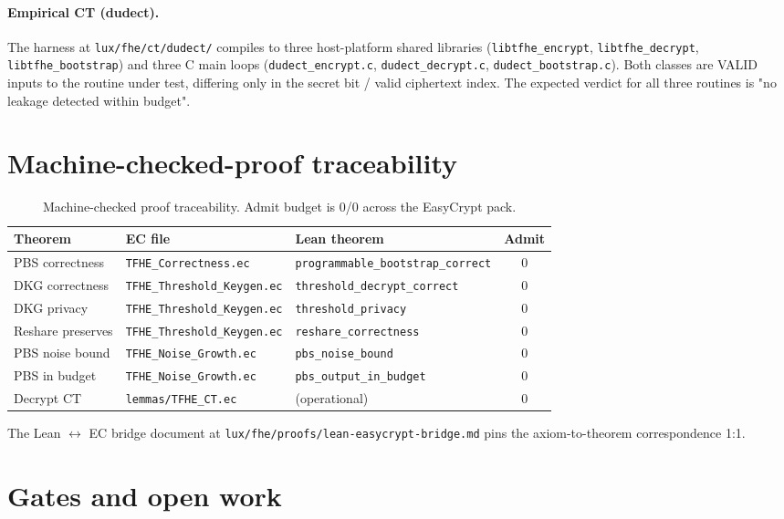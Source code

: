\documentclass[11pt,a4paper]{article}
\begin{document}
\paragraph{Empirical CT (dudect).} The harness at
\texttt{lux/fhe/ct/dudect/} compiles to three host-platform shared
libraries (\texttt{libtfhe\_encrypt}, \texttt{libtfhe\_decrypt},
\texttt{libtfhe\_bootstrap}) and three C main loops
(\texttt{dudect\_encrypt.c}, \texttt{dudect\_decrypt.c},
\texttt{dudect\_bootstrap.c}). Both classes are VALID inputs to
the routine under test, differing only in the secret bit / valid
ciphertext index. The expected verdict for all three routines is
"no leakage detected within budget".

\section{Machine-checked-proof traceability}
\label{sec:traceability}

\begin{table}[h]
\centering
\small
\begin{tabular}{lllc}
\toprule
Theorem & EC file & Lean theorem & Admit\\
\midrule
PBS correctness & \texttt{TFHE\_Correctness.ec} & \texttt{programmable\_bootstrap\_correct} & 0\\
DKG correctness & \texttt{TFHE\_Threshold\_Keygen.ec} & \texttt{threshold\_decrypt\_correct} & 0\\
DKG privacy & \texttt{TFHE\_Threshold\_Keygen.ec} & \texttt{threshold\_privacy} & 0\\
Reshare preserves & \texttt{TFHE\_Threshold\_Keygen.ec} & \texttt{reshare\_correctness} & 0\\
PBS noise bound & \texttt{TFHE\_Noise\_Growth.ec} & \texttt{pbs\_noise\_bound} & 0\\
PBS in budget & \texttt{TFHE\_Noise\_Growth.ec} & \texttt{pbs\_output\_in\_budget} & 0\\
Decrypt CT & \texttt{lemmas/TFHE\_CT.ec} & (operational) & 0\\
\bottomrule
\end{tabular}
\caption{Machine-checked proof traceability. Admit budget is 0/0
across the EasyCrypt pack.}
\label{tab:traceability}
\end{table}

The Lean $\leftrightarrow$ EC bridge document at
\texttt{lux/fhe/proofs/lean-easycrypt-bridge.md} pins the
axiom-to-theorem correspondence 1:1.

\section{Gates and open work}\label{sec:gates}
\end{document}

